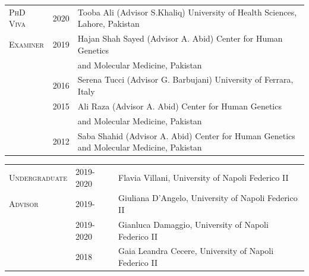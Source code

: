 \documentclass[openany]{book}
\begin{document}
\noindent
\begin{tabular}{l l l{4cm}}
\textsc{PhD Viva} & 2020 &  Tooba Ali (Advisor S.Khaliq) University of Health Sciences, Lahore, Pakistan \\
\textsc{Examiner} & 2019 & Hajan Shah Sayed (Advisor A. Abid) Center for Human Genetics\\
 &  & and Molecular Medicine, Pakistan\\
 & 2016 & Serena Tucci (Advisor G. Barbujani) University of Ferrara, Italy\\
 & 2015 & Ali Raza (Advisor A. Abid) Center for Human Genetics \\
 &  & and Molecular Medicine, Pakistan\\
 & 2012 & Saba Shahid (Advisor A. Abid) Center for Human Genetics and Molecular Medicine, Pakistan\\
\end{tabular}
\newline 

\noindent 
\begin{tabular}{l  l l}
\textsc{Undergraduate} & 2019-2020 & Flavia Villani, University of Napoli Federico II\\
\textsc{Advisor} & 2019- & Giuliana D'Angelo, University of Napoli Federico II\\
 & 2019-2020 & Gianluca Damaggio, University of Napoli Federico II\\
 & 2018 & Gaia Leandra Cecere, University of Napoli Federico II\\
\end{tabular}
\newline 
\end{document}
